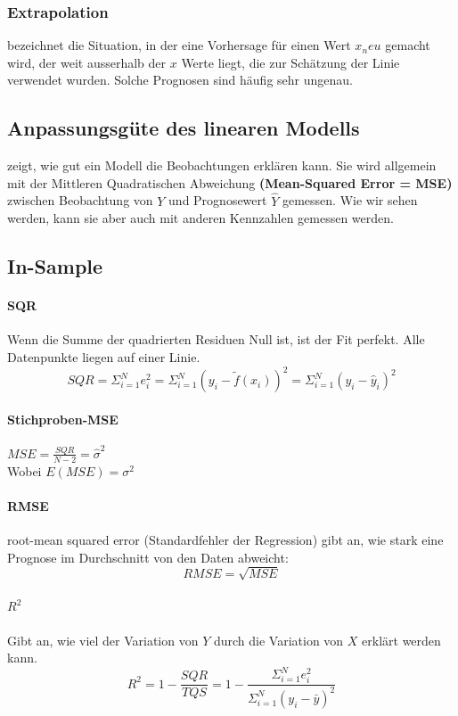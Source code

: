 \documentclass[a3paper, 8pt]{extarticle}
\begin{document}
\begin{multicols*}{5}
\subsubsection{Extrapolation}
bezeichnet die Situation, in der eine Vorhersage für einen Wert $x_neu$ gemacht wird, der weit ausserhalb der $x$ Werte liegt, die zur Schätzung der Linie verwendet wurden. Solche Prognosen sind häufig sehr ungenau.
   
\subsection{Anpassungsgüte des linearen Modells}
zeigt, wie gut ein Modell die Beobachtungen erklären kann. Sie wird allgemein mit der Mittleren Quadratischen Abweichung \textbf{(Mean-Squared Error = MSE)} zwischen Beobachtung von $Y$ und Prognosewert $\hat{Y}$ gemessen. Wie wir sehen werden, kann sie aber auch mit anderen Kennzahlen gemessen werden.
\subsection{In-Sample}
\paragraph{SQR} Wenn die Summe der quadrierten Residuen Null ist, ist der Fit perfekt. Alle Datenpunkte liegen
auf einer Linie. $$SQR=\Sigma_{i=1}^N e^2_i=\Sigma_{i=1}^N (y_i-\tilde{f}(x_i))^2=\Sigma_{i=1}^N (y_i-\hat{y}_i)^2$$

\paragraph{Stichproben-MSE} $MSE=\frac{SQR}{N-2}=\hat{\sigma}^2$\\ Wobei $E(MSE)=\sigma^2$

\paragraph{RMSE} root-mean squared error (Standardfehler der Regression) gibt an, wie stark eine Prognose im Durchschnitt von den Daten abweicht:
$$RMSE=\sqrt{MSE}$$

\paragraph{$R^2$} Gibt an, wie viel der Variation von $Y$ durch die Variation von $X$ erklärt werden kann.
$$R^2=1-\frac{SQR}{TQS}=1-\frac{\Sigma_{i=1}^N e_i^2}{\Sigma_{i=1}^N(y_i-\bar{y})^2}$$


\end{multicols*}
\end{document}
